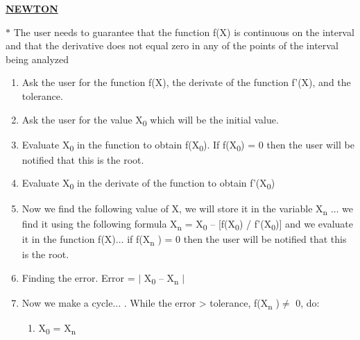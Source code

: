 \documentclass[12pt]{article}
\renewcommand{\_}{\kern-1.5pt\textunderscore\kern-1.5pt}
\begin{document}
{\fontsize{16pt}{19.2pt}\selectfont \textbf{\uline{NEWTON}}\par}\par


\vspace{\baselineskip}
$\ast$ The user needs to guarantee that the function f(X) is continuous on the interval and that the derivative does not equal zero in any of the points of the interval being analyzed\par

\begin{enumerate}
	\item Ask the user for the function f(X), the derivate of the function f’(X), and the tolerance. \par

	\item Ask the user for the value X\textsubscript{0} which will be the initial value. \par

	\item Evaluate X\textsubscript{0 }in the function to obtain f(X\textsubscript{0}). If f(X\textsubscript{0}) = 0 then the user will be notified that this is the root. \par

	\item Evaluate X\textsubscript{0} in the derivate of the function to obtain f’(X\textsubscript{0}) \par

	\item Now we find the following value of X, we will store it in the variable X\textsubscript{n }$ \ldots $  we find it using the following formula X\textsubscript{n }= X\textsubscript{0 }– [f(X\textsubscript{0}) / f’(X\textsubscript{0})] and we evaluate it in the function f(X)$ \ldots $  if f(X\textsubscript{n }) = 0 then the user will be notified that this is the root. \par

	\item Finding the error. Error = $ \vert $  X\textsubscript{0 }– X\textsubscript{n  }$ \vert $ \par

	\item Now we make a cycle$ \ldots $ . While the error > tolerance, f(X\textsubscript{n })$ \neq $ 0, do:\par

\begin{enumerate}
	\item X\textsubscript{0} = X\textsubscript{n}\par


\end{enumerate}
\end{enumerate}
\end{document}
